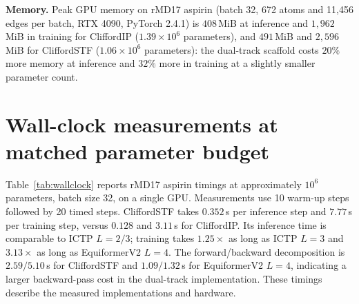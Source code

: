 \textbf{Memory.} Peak GPU memory on rMD17 aspirin (batch 32, 672 atoms and 11{,}456 edges per batch, RTX 4090, PyTorch 2.4.1) is $408$\,MiB at inference and $1{,}962$\,MiB in training for CliffordIP ($1.39\times10^6$ parameters), and $491$\,MiB and $2{,}596$\,MiB for CliffordSTF ($1.06\times10^6$ parameters): the dual-track scaffold costs $20\%$ more memory at inference and $32\%$ more in training at a slightly smaller parameter count.

\section{Wall-clock measurements at matched parameter budget}\label{supp:wallclock}

Table~\ref{tab:wallclock} reports rMD17 aspirin timings at approximately $10^6$ parameters, batch size 32, on a single GPU. Measurements use 10 warm-up steps followed by 20 timed steps. CliffordSTF takes $0.352$\,s per inference step and $7.77$\,s per training step, versus $0.128$ and $3.11$\,s for CliffordIP. Its inference time is comparable to ICTP $L{=}2/3$; training takes $1.25\times$ as long as ICTP $L{=}3$ and $3.13\times$ as long as EquiformerV2 $L{=}4$. The forward/backward decomposition is $2.59/5.10$\,s for CliffordSTF and $1.09/1.32$\,s for EquiformerV2 $L{=}4$, indicating a larger backward-pass cost in the dual-track implementation. These timings describe the measured implementations and hardware.

